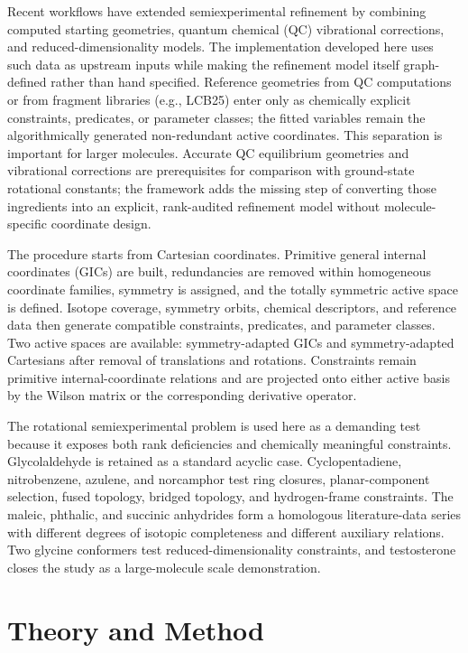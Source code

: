 \documentclass[aip,jcp,reprint,longbibliography,floatfix]{revtex4-2}
\begin{document}
Recent workflows have extended semiexperimental refinement by combining
computed starting geometries, quantum chemical (QC) vibrational corrections, and
reduced-dimensionality models.\cite{Mendolicchio2025FastDvib} The implementation
developed here uses such data as upstream inputs while making the refinement
model itself graph-defined rather than hand specified. Reference geometries from QC
computations or from fragment libraries (e.g., LCB25\cite{Lazzari2025LCB25})
enter only as chemically explicit constraints, predicates, or parameter
classes; the fitted variables remain the algorithmically generated
non-redundant active coordinates. This separation is important for larger
molecules. Accurate QC equilibrium geometries and vibrational corrections are
prerequisites for comparison with ground-state rotational constants; the
framework adds the missing step of converting those ingredients into an
explicit, rank-audited refinement model without molecule-specific coordinate
design.

The procedure starts from Cartesian coordinates. Primitive general internal
coordinates (GICs) are built, redundancies are removed within homogeneous coordinate
families, symmetry is assigned, and the totally symmetric active space is defined.
Isotope coverage, symmetry orbits, chemical descriptors, and reference data then generate
compatible constraints, predicates, and parameter classes. Two active spaces
are available: symmetry-adapted GICs and symmetry-adapted Cartesians after
removal of translations and rotations. Constraints remain primitive
internal-coordinate relations and are projected onto either active basis by
the Wilson matrix or the corresponding derivative operator.\cite{Wilson1955}

The rotational semiexperimental problem is used here as a demanding test
because it exposes both rank deficiencies and chemically meaningful
constraints. Glycolaldehyde is retained as a standard acyclic case.
Cyclopentadiene, nitrobenzene, azulene, and norcamphor test ring closures,
planar-component selection, fused topology, bridged topology, and
hydrogen-frame constraints. The maleic, phthalic, and succinic anhydrides form
a homologous literature-data series with different degrees of isotopic
completeness and different auxiliary relations. Two glycine conformers test
reduced-dimensionality constraints, and testosterone closes the study as a
large-molecule scale demonstration.


\section{Theory and Method}
\end{document}
